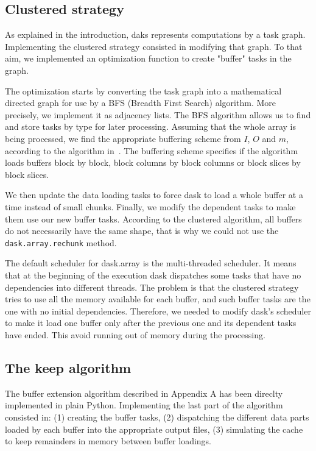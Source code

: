 \documentclass[conference]{IEEEtran}
\begin{document}
\subsection{Clustered strategy}

As explained in the introduction, daks represents computations by a task graph.
Implementing the clustered strategy consisted in modifying that graph. To that
aim, we implemented an optimization function to create "buffer" tasks in the
graph.

The optimization starts by converting the task graph into a mathematical
directed graph for use by a BFS (Breadth First Search) algorithm. More
precisely, we implement it as adjacency lists. The BFS algorithm allows us to
find and store tasks by type for later processing. Assuming that the whole array
is being processed, we find the appropriate buffering scheme from $I$, $O$ and
$m$, according to the algorithm in~\cite{seqalgorithms}. The buffering scheme
specifies if the algorithm loads buffers block by block, block columns by
block columns or block slices by block slices.

We then update the data loading tasks to force dask to load a whole buffer at
a time instead of small chunks. Finally, we modify the dependent tasks to make
them use our new buffer tasks. According to the clustered algorithm, all buffers
do not necessarily have the same shape, that is why we could not use the
\texttt{dask.array.rechunk} method.

The default scheduler for dask.array is the multi-threaded scheduler. It means
that at the beginning of the execution dask dispatches some tasks that have
no dependencies into different threads. The problem is that the clustered
strategy tries to use all the memory available for each buffer, and such buffer
tasks are the one with no initial dependencies. Therefore, we needed to
modify dask's scheduler to make it load one buffer only after the previous one
and its dependent tasks have ended. This avoid running out of memory during the
processing.

\subsection{The keep algorithm}

The buffer extension algorithm described in Appendix A has been direclty
implemented in plain Python. Implementing the last part of the algorithm
consisted in: (1) creating the buffer tasks, (2) dispatching the different data
parts loaded by each buffer into the appropriate output files, (3) simulating
the cache to keep remainders in memory between buffer loadings.
\end{document}
